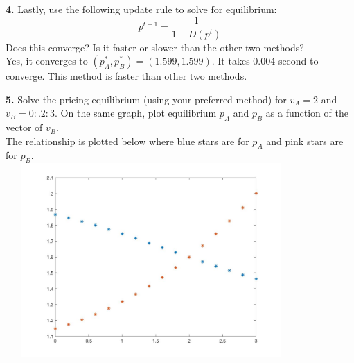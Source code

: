 \documentclass[10pt]{article}
\begin{document}
\vspace{2em}
\noindent
\textbf{4.}
Lastly, use the following update rule to solve for equilibrium:
\begin{equation}
	p^{t+1} = \frac{1}{1-D(p^t)}
\end{equation}
Does this converge? Is it faster or slower than the other two methods?\\[2em]

Yes, it converges to  $(p^*_A, p^*_B)=(1.599, 1.599)$. It takes 0.004 second to converge. This method is faster than other two methods.

\vspace{2em}



\noindent
\textbf{5.} Solve the pricing equilibrium (using your preferred method) for $v_A=2$ and $v_B=0:.2:3$. On the same graph, plot equilibrium $p_A$ and $p_B$ as a function of the vector of $v_B$. \\[2em]

The relationship is plotted below where blue stars are for $p_A$ and pink stars are for $p_B$.  \\
\includegraphics[width=30em, height=20em ]{plot.jpg}
\end{document}
